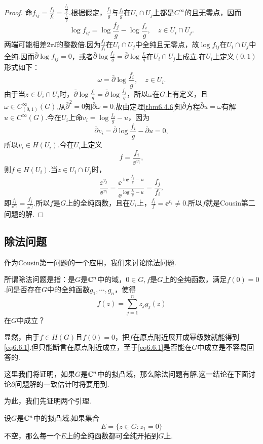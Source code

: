 \begin{proof}
	命$f_{ij}=\frac{f_j}{f_i}=\frac{\frac{f_j}{g}}{\frac{f_i}{g}}$.根据假定，$\frac{f_j}{g}$与$\frac{f_i}{g}$在$U_i\cap U_j$上都是$C^\infty$的且无零点，因而
	\[\log f_{ij}=\log\frac{f_j}{g}-\log\frac{f_i}{g},\quad z\in U_i\cap U_j.\]
	两端可能相差$2\pi\ii$的整数倍.因为$\frac{f_j}{f_i}$在$U_i\cap U_j$中全纯且无零点，故$\log f_{ij}$在$U_i\cap U_j$中全纯.因而$\bar{\partial}\log f_{ij}=0$，或者$\bar{\partial}\log\frac{f_j}{g}=\bar{\partial}\log\frac{f_i}{g}$在$U_i\cap U_j$上成立.在$U_i$上定义$(0,1)$形式如下：
	\[\omega=\bar{\partial}\log\frac{f_i}{g},\quad z\in U_i.\]
	由于当$z\in U_i\cap U_j$时，$\bar{\partial}\log\frac{f_i}{g}=\bar{\partial}\log\frac{f_j}{g}$，所以$\omega$在$G$上有定义，且$\omega\in C_{(0,1)}^\infty(G)$.从$\bar{\partial}^2=0$知$\bar{\partial}\omega=0$.故由定理\ref{thm6.4.6}知$\bar{\partial}$方程$\bar{\partial}u=\omega$有解$u\in C^\infty(G)$.今在$U_i$上命$v_i=\log\frac{f_i}{g}-u$，因为
	\[\bar{\partial}v_i=\bar{\partial}\log\frac{f_i}{g}-\bar{\partial}u=0,\]
	所以$v_i\in H(U_i)$.今在$U_i$上定义
	\[f=\frac{f_i}{\ee^{v_i}},\]
	则$f\in H(U_i)$.当$z\in U_i\cap U_j$时，
	\[\frac{\ee^{v_j}}{\ee^{v_i}}=\frac{\ee^{\log\frac{f_j}{g}-u}}{\ee^{\log\frac{f_i}{g}-u}}=\frac{f_j}{f_i},\]
	即$\frac{f_i}{\ee^{v_i}}=\frac{f_j}{\ee^{v_j}}$.所以$f$是$G$上的全纯函数，且在$U_i$上，$\frac{f_i}{f}=\ee^{v_i}\neq0$.所以$f$就是Cousin第二问题的解.
\end{proof}
\subsection{除法问题}
作为Cousin第一问题的一个应用，我们来讨论除法问题.

所谓除法问题是指：是$G$是$\mathbb C^n$中的域，$0\in G,f$是$G$上的全纯函数，满足$f(0)=0$.问是否存在$G$中的全纯函数$g_1,\cdots,g_n$，使得
\begin{equation}\label{eq6.6.1}
	f(z)=\sum_{j=1}^{n}z_jg_j(z)
\end{equation}
在$G$中成立？

显然，由于$f\in H(G)$且$f(0)=0$，把$f$在原点附近展开成幂级数就能得到\eqref{eq6.6.1}.但只能断言在原点附近成立，至于\eqref{eq6.6.1}是否能在$G$中成立是不容易回答的.

这里我们将证明，如果$G$是$\mathbb C^n$中的拟凸域，那么除法问题有解.这一结论在下面讨论$\bar{\partial}$问题解的一致估计时将要用到.

为此，我们先证明两个引理.
\begin{lemma}\label{lem6.6.3}
	设$G$是$\mathbb C^n$中的拟凸域.如果集合
	\[E=\{z\in G\colon z_1=0\}\]
	不空，那么每一个$E$上的全纯函数都可全纯开拓到$G$上.
\end{lemma}

